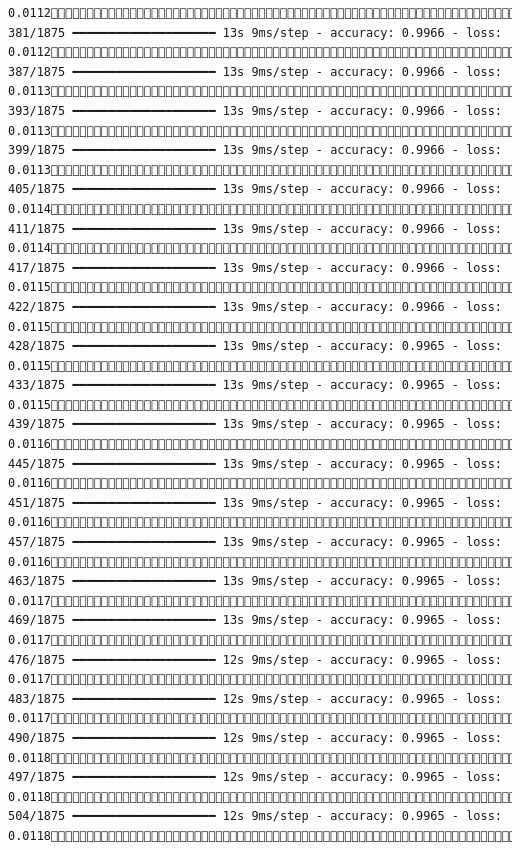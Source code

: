 \documentclass[
  letterpaper,
  DIV=11,
  numbers=noendperiod]{scrreprt}
\begin{document}
\begin{verbatim}
0.0112 381/1875 ━━━━━━━━━━━━━━━━━━━━ 13s 9ms/step - accuracy: 0.9966 - loss: 0.0112 387/1875 ━━━━━━━━━━━━━━━━━━━━ 13s 9ms/step - accuracy: 0.9966 - loss: 0.0113 393/1875 ━━━━━━━━━━━━━━━━━━━━ 13s 9ms/step - accuracy: 0.9966 - loss: 0.0113 399/1875 ━━━━━━━━━━━━━━━━━━━━ 13s 9ms/step - accuracy: 0.9966 - loss: 0.0113 405/1875 ━━━━━━━━━━━━━━━━━━━━ 13s 9ms/step - accuracy: 0.9966 - loss: 0.0114 411/1875 ━━━━━━━━━━━━━━━━━━━━ 13s 9ms/step - accuracy: 0.9966 - loss: 0.0114 417/1875 ━━━━━━━━━━━━━━━━━━━━ 13s 9ms/step - accuracy: 0.9966 - loss: 0.0115 422/1875 ━━━━━━━━━━━━━━━━━━━━ 13s 9ms/step - accuracy: 0.9966 - loss: 0.0115 428/1875 ━━━━━━━━━━━━━━━━━━━━ 13s 9ms/step - accuracy: 0.9965 - loss: 0.0115 433/1875 ━━━━━━━━━━━━━━━━━━━━ 13s 9ms/step - accuracy: 0.9965 - loss: 0.0115 439/1875 ━━━━━━━━━━━━━━━━━━━━ 13s 9ms/step - accuracy: 0.9965 - loss: 0.0116 445/1875 ━━━━━━━━━━━━━━━━━━━━ 13s 9ms/step - accuracy: 0.9965 - loss: 0.0116 451/1875 ━━━━━━━━━━━━━━━━━━━━ 13s 9ms/step - accuracy: 0.9965 - loss: 0.0116 457/1875 ━━━━━━━━━━━━━━━━━━━━ 13s 9ms/step - accuracy: 0.9965 - loss: 0.0116 463/1875 ━━━━━━━━━━━━━━━━━━━━ 13s 9ms/step - accuracy: 0.9965 - loss: 0.0117 469/1875 ━━━━━━━━━━━━━━━━━━━━ 13s 9ms/step - accuracy: 0.9965 - loss: 0.0117 476/1875 ━━━━━━━━━━━━━━━━━━━━ 12s 9ms/step - accuracy: 0.9965 - loss: 0.0117 483/1875 ━━━━━━━━━━━━━━━━━━━━ 12s 9ms/step - accuracy: 0.9965 - loss: 0.0117 490/1875 ━━━━━━━━━━━━━━━━━━━━ 12s 9ms/step - accuracy: 0.9965 - loss: 0.0118 497/1875 ━━━━━━━━━━━━━━━━━━━━ 12s 9ms/step - accuracy: 0.9965 - loss: 0.0118 504/1875 ━━━━━━━━━━━━━━━━━━━━ 12s 9ms/step - accuracy: 0.9965 - loss: 0.0118 
\end{verbatim}
\end{document}
